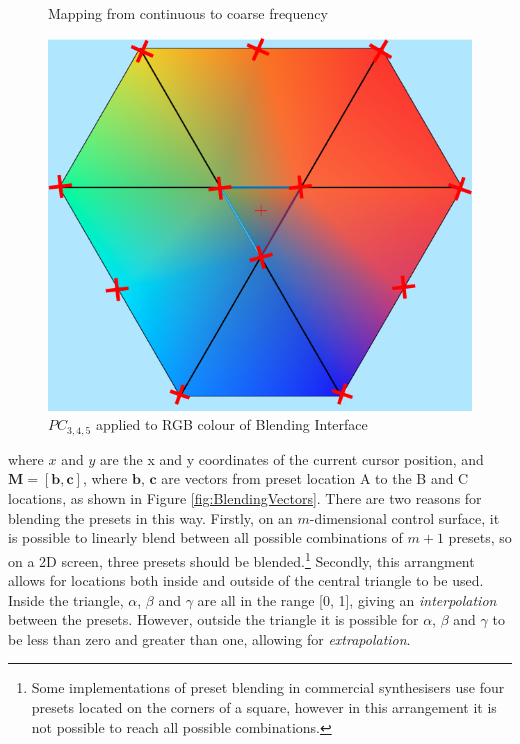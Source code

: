 \documentclass[11pt, oneside]{report}   	%
\renewcommand{\vec}[1]{\mathbf{#1}}
\begin{document}
\begin{figure}
	\caption{Mapping from continuous to coarse frequency}
	\label{fig:Freq Coarse}
	\includegraphics[width = \textwidth/3]{BlendingColours2.png}
	\caption{$PC_{3,4,5}$ applied to RGB colour of Blending Interface}
	\label{fig:BlendingColours}
	\vspace{-30pt}
\end{figure}
where $x$ and $y$ are the x and y coordinates of the current cursor position, and $\vec{M} =[\vec{b},  \vec{c}]$, where $\vec{b}$,  $\vec{c}$ are vectors from preset location A to the B and C locations, as shown in Figure \ref{fig:BlendingVectors}. There are two reasons for blending the presets in this way. Firstly, on an $m$-dimensional control surface, it is possible to linearly blend between all possible combinations of $m+1$ presets, so on a 2D screen, three presets should be blended.\footnote{Some implementations of preset blending in commercial synthesisers use four presets located on the corners of a square, however in this arrangement it is not possible to reach all possible combinations.} Secondly, this arrangment allows for locations both inside and outside of the central triangle to be used. Inside the triangle, $\alpha$, $\beta$ and $\gamma$ are all in the range [0, 1], giving an \emph{interpolation} between the presets. However, outside the triangle it is possible for $\alpha$, $\beta$ and $\gamma$ to be less than zero and greater than one, allowing for \emph{extrapolation}.
\end{document}
